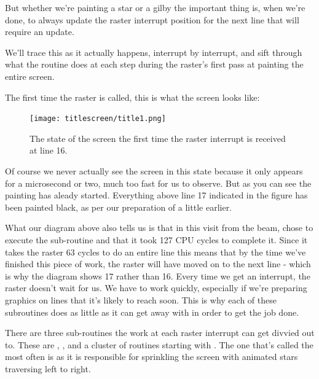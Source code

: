But whether we're painting a star or a gilby the important thing is, when we're
done, to always update the raster interrupt position for the next line that
will require an update. 

We'll trace this as it actually happens, interrupt by
interrupt, and sift through what the
 routine
does at each step during the raster's first pass at painting the entire screen.

The first time the raster is called, this is what the screen looks like:

\begin{figure}[H]
    \centering
      \texttt{[image: titlescreen/title1.png]}%
\caption{The state of the screen the first time the raster interrupt is received at line 16.}
\end{figure}

Of course we never actually see the screen in this state because it only appears for a microsecond or two, much too
fast for us to observe. But as you can see the painting has aleady started. Everything above line 17 indicated in 
the figure has been painted black, as per our preparation of  a little earlier.

What our diagram above also tells us is that in this visit from the beam,  chose to execute
the sub-routine  and that it took 127 CPU cycles to complete it. Since it takes the
raster 63 cycles to do an entire line this means that by the time we've finished this piece of work, the raster will have
moved on to the next line - which is why the diagram shows 17 rather than 16. Every time we get an interrupt, the 
raster doesn't wait for us. We have to work quickly, especially if we're preparing graphics on lines that it's likely
to reach soon. This is why each of these subroutines does as little as it can get away with in order to get the job done.

There are three sub-routines the work at each raster interrupt can get divvied out to. These are ,
, and a cluster of routines starting with . The one
that's called the most often is  as it is responsible for sprinkling the screen with 
animated stars traversing left to right.


